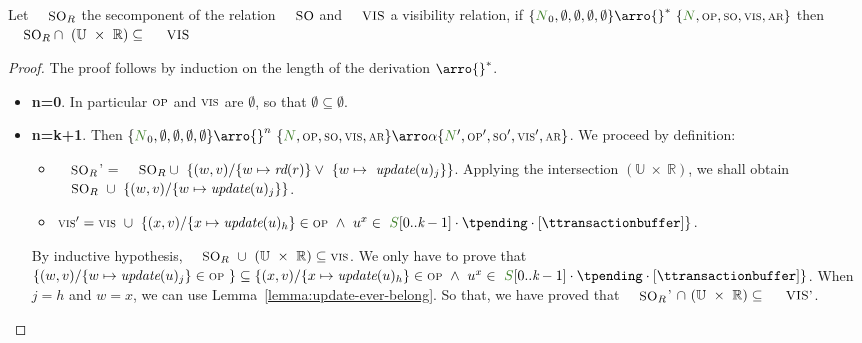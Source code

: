 \documentclass[envcountsect,runningheads,orivec]{llncs}
\begin{document}
\begin{theorem}\label{theorem:read-my-writes}

Let $\textsc{\small{SO}}_R$ the se\cond component of the relation $\textsc{\small{SO}}$ and $\textsc{\small{VIS}}$ a visibility relation, if $\environment{\systemterm_0}{\emptyset}{\emptyset}{\emptyset}{\emptyset} \arro{} ^*\ \environment{\systemterm}{\op}{\so}{\vis}{\arb}$ then $\textsc{\small{SO}}_R \cap \ (\mathbb{U}\ \times \ \mathbb{R})  \subseteq \ \textsc{\small{VIS}}$

\end{theorem}


\begin{proof} The proof follows by induction on the length of the derivation $\arro{} ^*$.
\begin{itemize}
   \item{\bf n=0}. In particular $\textsc{\scriptsize{OP}}$ and $\textsc{\scriptsize{VIS}}$ are $\emptyset$, so that $\emptyset \subseteq \emptyset$.
   \item{\bf n=k+1}. Then $\environment{\systemterm_0}{\emptyset}{\emptyset}{\emptyset}{\emptyset} \arro{} ^n\ \environment{\systemterm}{\op}{\so}{\vis}{\arb} \arroi{\alpha} \environment{\systemterm'}{\op'}{\so'}{\vis'}{\arb}$. We proceed by 
definition:
	
	\begin{itemize}
        \item $\textsc{\small{SO}}_R$' = $\textsc{\small{SO}}_R \cup\ \{(w,v) / \{w \mapsto \readtran{r}\} \lor\ \{w \mapsto \ \updatebyclient{j}\} \}$. Applying the intersection $(\mathbb{U}\ \times \ \mathbb{R})$, we shall obtain $\textsc{\small{SO}}_R \ \cup\ \{(w,v) / \{w \mapsto \updatebyclient{j}\} \}$.				
				\item $\vis' = \vis \ \cup \ \{ (x,v) / \{x \mapsto \updatebyclient{h}\} \in \op \ \land \  u^x \in \ \queuemessage[0..\tknown-1] \cdot \tpending \cdot [\ttransactionbuffer] \}$.
\end{itemize}
By inductive hypothesis, $\textsc{\small{SO}}_R \ \cup\ (\mathbb{U}\ \times \ \mathbb{R}) \subseteq \vis$. We only have to prove that $\{(w,v) / \{w \mapsto \updatebyclient{j}\} \in \op  \ \} \subseteq \{ (x,v) / \{x \mapsto \updatebyclient{h}\} \in \op \ \land \  u^x \in \ \queuemessage[0..\tknown-1] \cdot \tpending \cdot [\ttransactionbuffer] \}$. When $j = h$ and $w = x$, we can use Lemma~\ref{lemma:update-ever-belong}. So that, we have proved that $\textsc{\small{SO}}_R$' $\cap \ (\mathbb{U}\ \times \ \mathbb{R})  \subseteq \ \textsc{\small{VIS'}}$.
\end{itemize}
\end{proof}
\end{document}
